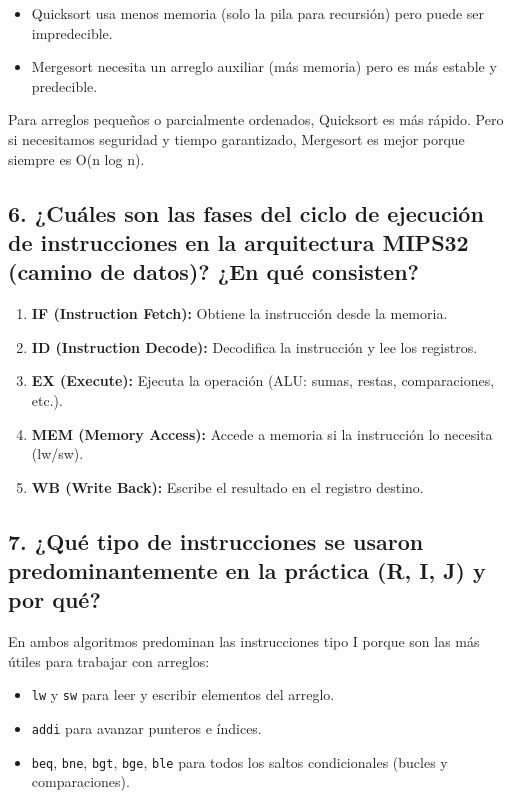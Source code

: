 \documentclass[12pt]{article}
\begin{document}
\begin{itemize}
    \item Quicksort usa menos memoria (solo la pila para recursión) pero puede ser impredecible.
    \item Mergesort necesita un arreglo auxiliar (más memoria) pero es más estable y predecible.
\end{itemize}

Para arreglos pequeños o parcialmente ordenados, Quicksort es más rápido. Pero si necesitamos seguridad y tiempo garantizado, Mergesort es mejor porque siempre es O(n log n).

\subsection*{6. ¿Cuáles son las fases del ciclo de ejecución de instrucciones en la arquitectura MIPS32 (camino de datos)? ¿En qué consisten?}

\begin{enumerate}
    \item \textbf{IF (Instruction Fetch):} Obtiene la instrucción desde la memoria.
    \item \textbf{ID (Instruction Decode):} Decodifica la instrucción y lee los registros.
    \item \textbf{EX (Execute):} Ejecuta la operación (ALU: sumas, restas, comparaciones, etc.).
    \item \textbf{MEM (Memory Access):} Accede a memoria si la instrucción lo necesita (lw/sw).
    \item \textbf{WB (Write Back):} Escribe el resultado en el registro destino.
\end{enumerate}

\subsection*{7. ¿Qué tipo de instrucciones se usaron predominantemente en la práctica (R, I, J) y por qué?}

En ambos algoritmos predominan las instrucciones tipo I porque son las más útiles para trabajar con arreglos:

\begin{itemize}
    \item \texttt{lw} y \texttt{sw} para leer y escribir elementos del arreglo.
    \item \texttt{addi} para avanzar punteros e índices.
    \item \texttt{beq}, \texttt{bne}, \texttt{bgt}, \texttt{bge}, \texttt{ble} para todos los saltos condicionales (bucles y comparaciones).
\end{itemize}
\end{document}
